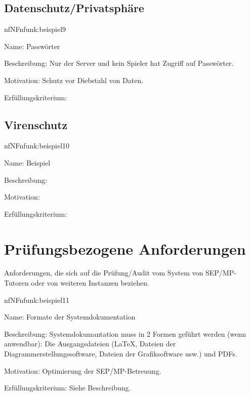 \subsection{Datenschutz/Privatsphäre}

\begin{description}[leftmargin=5em, style=sameline]	
	\begin{lhp}{nf}{NF}{nfunk:beispiel9}
		\item [Name:] Passwörter
		\item [Beschreibung:] Nur der Server und kein Spieler hat Zugriff auf Passwörter.
		\item [Motivation:] Schutz vor Diebstahl von Daten.
		\item [Erfüllungskriterium:] 
	\end{lhp}
\end{description}


\subsection{Virenschutz}

\begin{description}[leftmargin=5em, style=sameline]	
	\begin{lhp}{nf}{NF}{nfunk:beispiel10}
		\item [Name:] Beispiel
		\item [Beschreibung:] 
		\item [Motivation:] 
		\item [Erfüllungskriterium:] 
	\end{lhp}
\end{description}

\section{Prüfungsbezogene Anforderungen}

Anforderungen, die sich auf die Prüfung/Audit vom System von SEP/MP-Tutoren oder von weiteren Instanzen beziehen.


\begin{description}[leftmargin=5em, style=sameline]	
	\begin{lhp}{nf}{NF}{nfunk:beispiel11}
		\item [Name:] Formate der Systemdokumentation
		\item [Beschreibung:] Systemdokumantation muss in 2 Formen geführt werden (wenn anwendbar): Die Ausgangsdateien (\LaTeX, Dateien der Diagrammerstellungssoftware, Dateien der Grafiksoftware usw.) und PDFs.
		\item [Motivation:] Optimierung der SEP/MP-Betreuung.
		\item [Erfüllungskriterium:] Siehe Beschreibung.
	\end{lhp}
\end{description}

